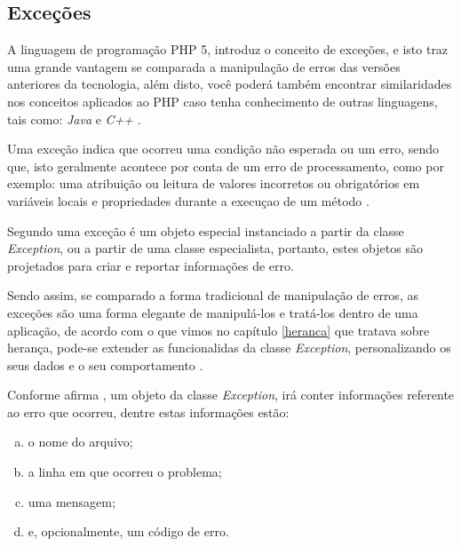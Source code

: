 \subsection{Exceções}

A linguagem de programação PHP 5, introduz o conceito de exceções, e isto traz
uma grande vantagem se comparada a manipulação de erros das versões anteriores
da tecnologia, além disto, você poderá também encontrar similaridades nos
conceitos aplicados ao PHP caso tenha conhecimento de outras linguagens, tais
como: \textit{Java} e \textit{C++} \cite{phpObjectsPatternsAndPractice}.

Uma exceção indica que ocorreu uma condição não esperada ou um erro, sendo que,
isto geralmente acontece por conta de um erro de processamento, como por
exemplo: uma atribuição ou leitura de valores incorretos ou obrigatórios em
variáveis locais e propriedades durante a execuçao de um método \cite{learningJava}.

Segundo  uma exceção é um objeto
especial instanciado a partir da classe \textit{Exception}, ou a partir de uma
classe especialista, portanto, estes objetos são projetados para criar e
reportar informações de erro.

Sendo assim, se comparado a forma tradicional de manipulação de erros, as
exceções são uma forma elegante de manipulá-los e tratá-los dentro de uma
aplicação, de acordo com o que vimos no capítulo \ref{heranca} que
tratava sobre herança, pode-se extender as funcionalidas da classe
\textit{Exception}, personalizando os seus dados e o seu comportamento \cite{phpMasterWriteCuttingEdgeCode}.

Conforme afirma , um objeto da classe
\textit{Exception}, irá conter informações referente ao erro que ocorreu, dentre
estas informações estão:

\begin{enumerate}[a)]
    \item o nome do arquivo;
    \item a linha em que ocorreu o problema;
    \item uma mensagem;
    \item e, opcionalmente, um código de erro.
\end{enumerate}

